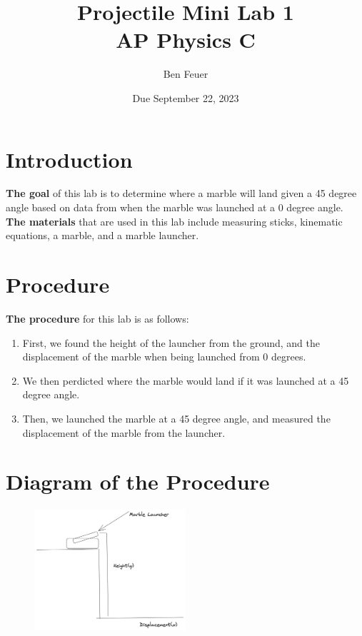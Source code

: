 \documentclass{report}
\title{\Huge{Projectile Mini Lab 1}\\\huge{AP Physics C}}
\author{\huge{Ben Feuer}}
\date{Due September 22, 2023}
\begin{document}
\maketitle
\newpage%
\pagebreak

\section{Introduction}

\textbf{The goal} of this lab is to determine where a marble will land given a 45 degree angle based on data from when the marble was launched at a 0 degree angle.
\\
\textbf{The materials} that are used in this lab include measuring sticks, kinematic equations, a marble, and a marble launcher. 

\section{Procedure}

\textbf{The procedure} for this lab is as follows:
\begin{enumerate}
  \item First, we found the height of the launcher from the ground, and the displacement of the marble when being launched from 0 degrees. 
  \item We then perdicted where the marble would land if it was launched at a 45 degree angle.
  \item Then, we launched the marble at a 45 degree angle, and measured the displacement of the marble from the launcher.
  \end{enumerate}


\section{Diagram of the Procedure}
        

\begin{figure}[h!]
  \begin{center}
    \includegraphics[width=0.5\textwidth]{diagram.png}
  \end{center}
\end{figure}
\end{document}
